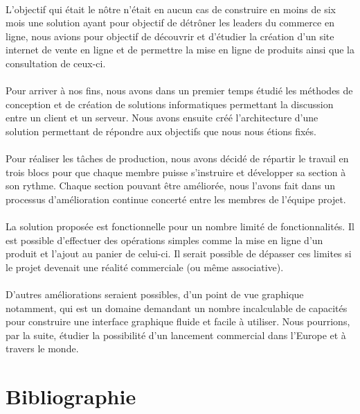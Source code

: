 \documentclass[a4paper, 12pt]{article}
\begin{document}
\paragraph{}L’objectif qui était le nôtre n’était en aucun cas de construire en moins de six mois une solution ayant pour objectif de détrôner les leaders du commerce en ligne, nous avions pour objectif de découvrir et d’étudier la création d’un site internet de vente en ligne et de permettre la mise en ligne de produits ainsi que la consultation de ceux-ci.
\paragraph{}Pour arriver à nos fins, nous avons dans un premier temps étudié les méthodes de conception et de création de solutions informatiques permettant la discussion entre un client et un serveur. Nous avons ensuite créé l’architecture d’une solution permettant de répondre aux objectifs que nous nous étions fixés.
\paragraph{}Pour réaliser les tâches de production, nous avons décidé de répartir le travail en trois blocs pour que chaque membre puisse s'instruire et développer sa section à son rythme. Chaque section pouvant être améliorée, nous l’avons fait dans un processus d’amélioration continue concerté entre les membres de l’équipe projet.
\paragraph{}La solution proposée est fonctionnelle pour un nombre limité de fonctionnalités. Il est possible d'effectuer des opérations simples comme la mise en ligne d’un produit et l’ajout au panier de celui-ci. Il serait possible de dépasser ces limites si le projet devenait une réalité commerciale (ou même associative).
\paragraph{}D’autres améliorations seraient possibles, d’un point de vue graphique notamment, qui est un domaine demandant un nombre incalculable de capacités pour construire une interface graphique fluide et facile à utiliser. Nous pourrions, par la suite, étudier la possibilité d’un lancement commercial dans l’Europe et à travers le monde.


\newpage
\section{Bibliographie}


\end{document}
